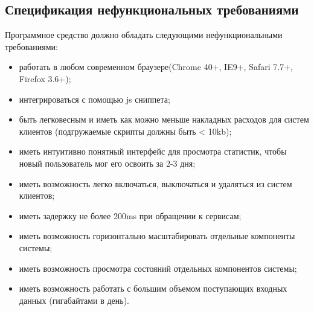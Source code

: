 \subsection{Спецификация нефункциональных требованиями}
\label{sub:models:func_non_req}

Программное средство должно обладать следующими нефункциональными требованиями:
\begin{itemize}
\item работать в любом современном браузере(Chrome 40+, IE9+, Safari 7.7+, Firefox 3.6+);
\item интегрироваться с помощью js сниппета;
\item быть легковесным  и иметь как можно меньше накладных расходов для систем клиентов (подгружаемые скрипты должны быть < 10kb);
\item иметь интуитивно понятный интерфейс для просмотра статистик, чтобы новый пользователь мог его освоить за 2-3 дня;
\item иметь возможность легко включаться, выключаться и удаляться из систем клиентов;
\item иметь задержку не более 200ms при обращении к сервисам;
\item иметь возможность горизонтально масштабировать отдельные компоненты системы;
\item иметь возможность просмотра состояний отдельных компонентов системы;
\item иметь возможность работать с большим объемом поступающих входных данных (гигабайтами в день).
\end{itemize}
